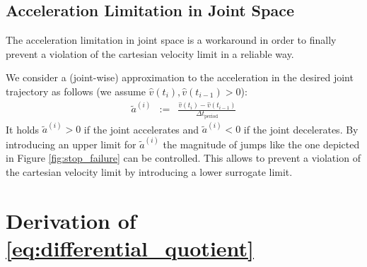 \documentclass{article}
\begin{document}
\subsection{Acceleration Limitation in Joint Space}\label{sec:acceleration_limitation_in_joint_space}
The acceleration limitation in joint space is a workaround in order to finally prevent a violation of the cartesian velocity limit in a reliable way.

We consider a (joint-wise) approximation to the acceleration in the desired joint trajectory as follows (we assume $\hat{v}(t_i), \hat{v}(t_{i-1})>0$):
\begin{eqnarray}
\tilde{a}^{(i)} &:=& \frac{\hat{v}(t_i)-\hat{v}(t_{i-1})}{\Delta t_{\mathrm{period}}}
\end{eqnarray}
It holds $\tilde{a}^{(i)}>0$ if the joint accelerates and $\tilde{a}^{(i)}<0$ if the joint decelerates. By introducing an upper limit for $\tilde{a}^{(i)}$ the magnitude of jumps like the one depicted in Figure \ref{fig:stop_failure} can be controlled. This allows to prevent a violation of the cartesian velocity limit by introducing a lower surrogate limit.

\appendix

\section{Derivation of \eqref{eq:differential_quotient}}
\end{document}
